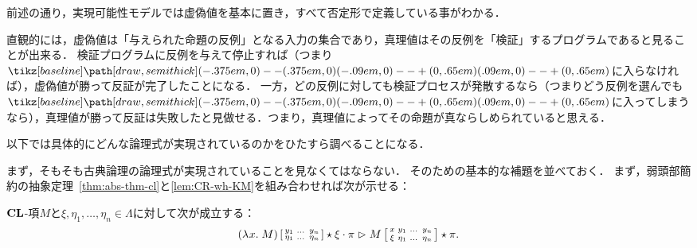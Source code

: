 \documentclass[realisability.tex]{subfiles}
\begin{document}
前述の通り，実現可能性モデルでは虚偽値を基本に置き，すべて否定形で定義している事がわかる．

直観的には，虚偽値は「与えられた命題の反例」となる入力の集合であり，真理値はその反例を「検証」するプログラムであると見ることが出来る．
検証プログラムに反例を与えて停止すれば（つまり$\pole$に入らなければ），虚偽値が勝って反証が完了したことになる．
一方，どの反例に対しても検証プロセスが発散するなら（つまりどう反例を選んでも$\pole$に入ってしまうなら），真理値が勝って反証は失敗したと見做せる．つまり，真理値によってその命題が真ならしめられていると思える．

以下では具体的にどんな論理式が実現されているのかをひたすら調べることになる．

まず，そもそも古典論理の論理式が実現されていることを見なくてはならない．
そのための基本的な補題を並べておく．
まず，弱頭部簡約の抽象定理~\ref{thm:abs-thm-cl}と\cref{lem:CR-wh-KM}を組み合わせれば次が示せる：
\begin{theorem}[抽象定理]\label{thm:abs-thm}
 $\mathord{\mathbf{CL}}$-項$M$と$\xi, \eta_1, \dots, \eta_n \in \Lambda$に対して次が成立する：
 \[
  (\lambda^{\mathsf{}}x.\;M)\left[\begin{smallmatrix}y_1 & \dots& y_n\\ \eta_1& \dots & \eta_n \end{smallmatrix}\right] \mathbin{\star} \xi \cdot \pi \mathrel{\rhd}
  M\left[\begin{smallmatrix}x & y_1 & \dots& y_n\\ \xi & \eta_1 & \dots &\eta_n \end{smallmatrix}\right] \mathbin{\star} \pi.
 \]
\end{theorem}
\end{document}
